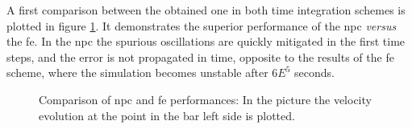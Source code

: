 \documentclass[preprint,12pt,a4paper]{elsarticle}
\begin{document}
A first comparison between the obtained one in both time integration
schemes is plotted in figure \ref{fig:Dyka-NPC-FE}. It demonstrates the
superior performance of the \acrshort{npc} \textit{versus} the \acrshort{fe}. In the \acrshort{npc} the
spurious oscillations are quickly mitigated in the first time steps,
and the error is not propagated in time, opposite to the results of the \acrshort{fe} scheme, where the
simulation becomes unstable after $6E^{5}$ seconds.
\begin{figure}\sidecaption
  \centering
  \caption{Comparison of \acrshort{npc} and \acrshort{fe}
      performances: In the picture the velocity evolution at the point in the bar left side
    is plotted.}
  \label{fig:Dyka-NPC-FE}
\end{figure}
\end{document}
